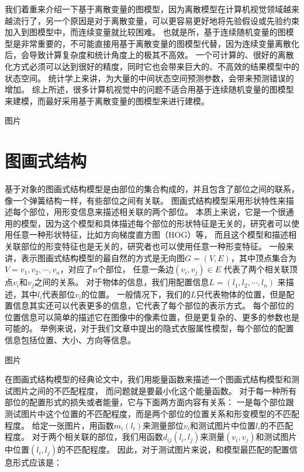 我们着重来介绍一下基于离散变量的图模型，因为离散模型在计算机视觉领域越来越流行了，另一个原因是对于离散变量，可以更容易更好地将先验假设或先验约束加入到图模型中，而连续变量就比较困难。
也就是所，基于连续随机变量的图模型是非常重要的，不可能直接用基于离散变量的图模型代替，因为连续变量离散化后，会导致计算复杂度和统计角度上的极其不高效。
一个可计算的、很好的离散化方式必须可以达到很好的精度，同时它也会带来巨大的、不高效的结果模型中的状态空间。
统计学上来讲，为大量的中间状态空间预测参数，会带来预测错误的增加。
综上所述，很多计算机视觉中的问题不适合用基于连续随机变量的图模型来建模，而最好采用基于离散变量的图模型来进行建模。

图片

\section{图画式结构}
基于对象的图画式结构模型是由部位的集合构成的，并且包含了部位之间的联系，像一个弹簧结构一样，有些部位之间有关联。
图画式结构模型采用形状特性来描述每个部位，用形变信息来描述相关联的两个部位。
本质上来说，它是一个很通用的模型，因为这个模型和具体描述每个部位的形状特征是无关的，研究者可以使用任意一种形状特征，比如方向梯度直方图（HOG）等，
而且这个模型和描述相关联部位的形变特征也是无关的，研究者也可以使用任意一种形变特征。
一般来讲，表示图画式结构模型的最自然的方式是无向图$G=(V, E)$，其中顶点集合为$V = {v_1, v_2, \cdots, v_n}$，对应了n个部位，
任意一条边$(v_i, v_j) \in E$ 代表了两个相关联顶点$v_i$和$v_j$之间的关系。
对于物体的信息，我们用配置信息$L = (l_1, l_2, \cdots, l_n)$ 来描述，其中$l_i$代表部位$v_i$的位置。
一般情况下，我们的$L$只代表物体的位置，但是配置信息其实还可以代表更多的信息，它代表了每个部位的表示方式。
每个部位的位置信息可以简单的描述它在图像中的像素位置，但是更复杂的、更多的参数也是可能的。
举例来说，对于我们文章中提出的隐式衣服属性模型，每个部位的配置信息包括位置、大小、方向等信息。

图片

在图画式结构模型的经典论文\cite{PS}中，我们用能量函数来描述一个图画式结构模型和测试图片之间的不匹配程度，
而问题就是要最小化这个能量函数。
对于每一种所有部位的配置形式的损失或者能量，它与下面两方面内容有关系：
一是每个部位跟测试图片中这个位置的不匹配程度，而是两个部位的位置关系和形变模型的不匹配程度。
给定一张图片，用函数$m_i(l_i)$来测量部位$v_i$和测试图片中位置$l_i$的不匹配程度。
对于两个相关联的部位，我们用函数$d_{ij}(l_i, l_j)$来测量$(v_i, v_j)$和测试图片中位置$(l_i, l_j)$的不匹配程度。
因此，对于测试图片来说，和模型最匹配的配置信息形式应该是：


